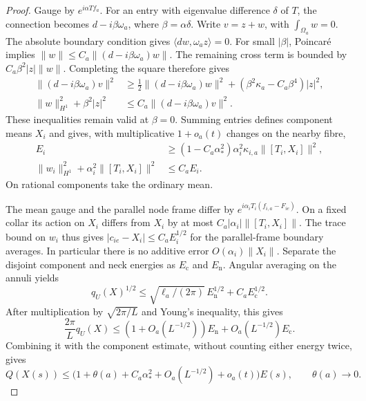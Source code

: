 \begin{proof}
Gauge by $e^{i\alpha T f_a}$. For an entry
with eigenvalue difference $\delta$ of $T$,
the connection becomes $d-i\beta\omega_a$,
where $\beta=\alpha\delta$.
Write $v=z+w$, with $\int_{\Omega_a}w=0$.
The absolute boundary condition gives
$\langle dw,\omega_a z\rangle=0$.
For small $|\beta|$, Poincaré implies
$\|w\|\le C_a\|(d-i\beta\omega_a)w\|$.
The remaining cross term is bounded by
$C_a\beta^2|z|\|w\|$. Completing the square
therefore gives
\[
 \begin{split}
 \|(d-i\beta\omega_a)v\|^2
 &\ge\tfrac12\|(d-i\beta\omega_a)w\|^2
                +(\beta^2\kappa_a-C_a\beta^4)|z|^2,\\
 \|w\|_{H^1}^2+\beta^2|z|^2
 &\le C_a\|(d-i\beta\omega_a)v\|^2 .
 \end{split}
\]
These inequalities remain valid at $\beta=0$.
Summing entries defines component means $X_i$
and gives, with multiplicative $1+o_a(t)$
changes on the nearby fibre,
\[
 \begin{split}
 E_i&\ge(1-C_a\alpha_*^2)
                  \alpha_i^2\kappa_{i,a}\|[T_i,X_i]\|^2,\\
 \|w_i\|_{H^1}^2+\alpha_i^2\|[T_i,X_i]\|^2
 &\le C_a E_i.
 \end{split}
\]
On rational components take the ordinary mean.

The mean gauge and the parallel node frame
differ by $e^{i\alpha_iT_i(f_{i,a}-F_{ie})}$.
On a fixed collar its action on $X_i$ differs
from $X_i$ by at most
$C_a|\alpha_i|\|[T_i,X_i]\|$.
The trace bound on $w_i$ thus gives
$|c_{ie}-X_i|\le C_a E_i^{1/2}$ for the
parallel-frame boundary averages.
In particular there is no additive error
$O(\alpha_i)\|X_i\|$.
Separate the disjoint component and neck
energies as $E_{\mathrm c}$ and $E_{\mathrm n}$.
Angular averaging on the annuli yields
\[
 q_U(X)^{1/2}
 \le\sqrt{\ell_a/(2\pi)}\,E_{\mathrm n}^{1/2}
                                +C_aE_{\mathrm c}^{1/2}.
 \]
After multiplication by $\sqrt{2\pi/L}$ and
Young's inequality, this gives
\[
 \frac{2\pi}{L}q_U(X)
 \le(1+O_a(L^{-1/2}))E_{\mathrm n}
                              +O_a(L^{-1/2})E_{\mathrm c}.
\]
Combining it with the component estimate,
without counting either energy twice, gives
\begin{equation}\label{eq:coupled-lower}
 Q(X(s))\le
 \bigl(1+\theta(a)+C_a\alpha_*^2
              +O_a(L^{-1/2})+o_a(t)\bigr)E(s),
 \qquad \theta(a)\to0 .
\end{equation}


\end{proof}
